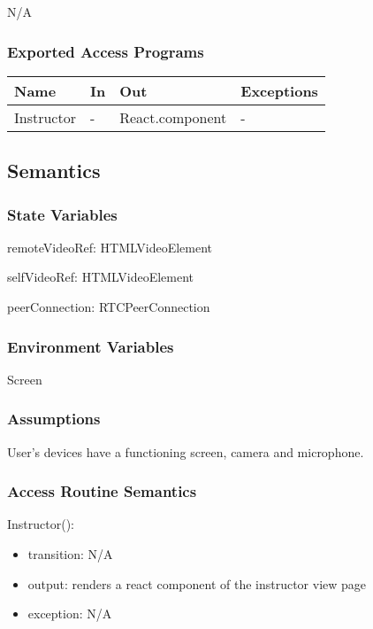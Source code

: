 \documentclass[12pt, titlepage]{article}
\begin{document}
N/A

\subsubsection{Exported Access Programs}

\begin{center}
  \begin{tabular}{p{4cm} p{4cm} p{4cm} p{2cm}}
    \hline
    \textbf{Name}    & \textbf{In} & \textbf{Out}          & \textbf{Exceptions} \\
    \hline
    Instructor & -     & React.component & -             \\
    \hline
  \end{tabular}
\end{center}

\subsection{Semantics}

\subsubsection{State Variables}

\noindent remoteVideoRef: HTMLVideoElement

\noindent selfVideoRef: HTMLVideoElement

\noindent peerConnection: RTCPeerConnection

\subsubsection{Environment Variables}

\noindent Screen

\subsubsection{Assumptions}

User's devices have a functioning screen, camera and microphone.

\subsubsection{Access Routine Semantics}

\noindent Instructor():
\begin{itemize}
\item transition: N/A
\item output: renders a react component of the instructor view page
\item exception: N/A
\end{itemize}
\end{document}
